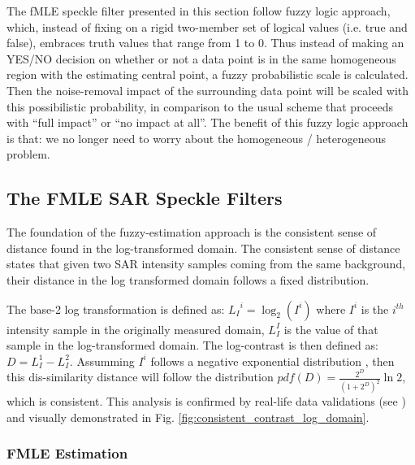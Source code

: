 The fMLE speckle filter presented in this section follow fuzzy logic approach,
  which, instead of fixing on a rigid two-member set of logical values (i.e. true and false),
  embraces truth values that range from 1 to 0.
Thus instead of making an YES/NO decision on whether or not a data point is in the same homogeneous region with the estimating central point, a fuzzy probabilistic scale is calculated.
Then the noise-removal impact of the surrounding data point will be scaled with this possibilistic probability,
  in comparison to the usual scheme that proceeds with ``full impact'' or ``no impact at all''.
The benefit of this fuzzy logic approach is that: we no longer need to worry about the homogeneous / heterogeneous problem.


\subsection{The FMLE SAR Speckle Filters}
  
The foundation of the fuzzy-estimation approach is the consistent sense of distance found in the log-transformed domain.
The consistent sense of distance states that given two SAR intensity samples coming from the same background, their distance in the log transformed domain follows a fixed distribution.

The base-2 log transformation is defined as:
${L_I}^i = \log_2{(I^i)}$ 
where 
	$I^i$ is the \textit{$i^{th}$} intensity sample in the originally measured domain,
	$L_I^I$ is the value of that sample in the log-transformed domain.
The log-contrast is then defined as:
$D= L_I^1 - L_I^2$. 
Assumming $I^i$ follows a negative exponential distribution \citep{Goodman_JOptSocAm_76}, 
  then this dis-similarity distance will follow the distribution 
$pdf(D)= \frac{2^D}{(1+2^D)^2} \ln2$,
  which is consistent.
This analysis is confirmed by real-life data validations (see \cite{Le_2010_ACRS}) and visually demonstrated in Fig. \ref{fig:consistent_contrast_log_domain}.

\subsubsection{FMLE Estimation}

